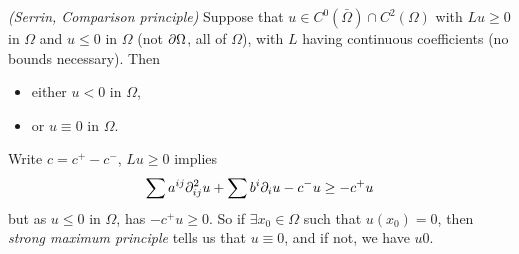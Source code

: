\documentclass[12pt,a4paper]{article}
\newenvironment{proof}
{\begin{changemargin}{1cm}{0.5cm} 
	}%
	{\end{changemargin}
}
\renewenvironment{i}
{\begin{itemize} 
	}%
	{\end{itemize}
}
\newenvironment{p}
{\begin{proof} 
	}%
	{\end{proof}
}
\begin{document}
\thm \emph{(Serrin, Comparison principle)} Suppose that $u\in C^0(\bar{\Omega}) \cap C^2(\Omega)$ with $Lu \geq 0$ in $\Omega$ and $u\leq 0$ in $\Omega$ (not $\partial \Omega$, all of $\Omega$), with $L$ having continuous coefficients (no bounds necessary). Then
\begin{i}
\item either $u< 0$ in $\Omega$,
\item or $u\equiv 0$ in $\Omega$.
\end{i}
\begin{p}
\pf Write $c= c^+ - c^-$, $Lu \geq 0$ implies
\begin{align*}
\sum a^{ij} \partial^2_{ij} u + \sum b^i \partial_{i} u - c^- u \geq - c^+ u 
\end{align*}
but as $u\leq 0$ in $\Omega$, has $-c^+ u \geq 0$. So if $\exists x_0 \in \Omega$ such that $u(x_0)=0$, then \emph{strong maximum principle} tells us that $u\equiv 0$, and if not, we have $u 0$.

\eop
\end{p}
\s
\end{document}
